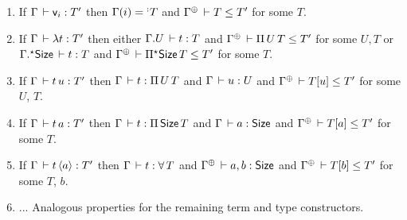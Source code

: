 \documentclass[acmsmall%
]{acmart}\settopmatter{printfolios=true}
\newcommand{\LONGVERSION}[1]{}
\newcommand{\SHORTVERSION}[1]{#1}
\begin{document}
\begin{lemma}
\label{lem:invty} \bla
\begin{enumerate}
\LONGVERSION{
\item If\/ $\Gamma \der \Nat a : T'$ then $\Gamma \der a : \Size$ and $\resurrect\Gamma \der \Set[0] \leq T'$.
\item If\/ $\Gamma \der \Set[\ell] : T'$ then $\resurrect\Gamma \der \Set[\ell+1] \leq T'$.
\item If\/ $\Gamma \der \piT U T : T'$ then $\Gamma \der U : s$ and $\cext \Gamma U \der T : s$ and $\resurrect\Gamma \der s \leq T'$ for some $s$.
\item If\/ $\Gamma \der \epiT \Size T : T'$ then
  $\cext\Gamma \Size \der T : s$ and $\resurrect\Gamma \der s \leq T'$.
}
\item If\/ $\Gamma \der \ind i : T'$ then $\Gamma(i) = \erann[\noterased] T$ and $\resurrect\Gamma \der T \leq T'$ for some $T$.
\item If\/ $\Gamma \der \lambda t : T'$ then either
  $\cext \Gamma U \der t : T$
  and
  $\resurrect\Gamma \der \piT U T \leq T'$
  for some $U,T$ or
  $\eext \Gamma \Size \der t : T$
  and
  $\resurrect\Gamma \der \epiT\Size T \leq T'$
  for some $T$.
\item If\/ $\Gamma \der t\,u : T'$ then $\Gamma \der t : \piT U T$ and $\Gamma \der u : U$ and $\resurrect\Gamma \der T[u] \leq T'$ for some $U$, $T$.
\item If\/ $\Gamma \der t\,a : T'$ then $\Gamma \der t : \piT \Size T$ and $\Gamma \der a : \Size$ and $\resurrect\Gamma \der T[a] \leq T'$ for some $T$.
\item If\/ $\Gamma \der t\,\ann a : T'$ then
   $\Gamma \der t : \forallT T$ and
   $\resurrect\Gamma \der a,b : \Size$ and
   $\resurrect\Gamma \der T[b] \leq T'$ for some $T$, $b$.
\LONGVERSION{
\item If\/ $\Gamma \der \zero a : T'$ then $\resurrect \Gamma \der a,b : \Size$ and $\resurrect\Gamma \der \Nat (b + 1) \leq T'$ for some $b$.
\item If\/ $\Gamma \der \suc a t : T'$ then $\resurrect \Gamma \der a,b : \Size$ and $\Gamma \der t : \Nat b$ and $\resurrect\Gamma \der \Nat(b+1) \leq T'$.
\item If\/ $\Gamma \der u\,\case[\ell] T {t_z} {t_s} : T'$ then $\Gamma \der u : \Nat (a+1)$ and $\Gamma \der T : \Nat(a+1) \to \Set[\ell]$ and $\Gamma \der t_z : T\,(\zero a)$ and $\Gamma \der t_s : \funT x {\Nat a} {T\,(\suc a x)}$ and $\resurrect\Gamma \der T\,u \leq T'$ for some $a$.
\item If\/ $\Gamma \der u\,\fix[\ell] T t : T'$ then
  $\Gamma \der u : \Nat a$ and
  $\Gamma \der T : \Adm\,\ell$ and
  $\Gamma \der t : \FixT\,T$ and
  $\resurrect\Gamma \der T\,a\,u \leq T'$.
} %
\SHORTVERSION{
\item ... Analogous properties for the remaining term and type constructors.
}
\end{enumerate}
\end{lemma}
\end{document}
